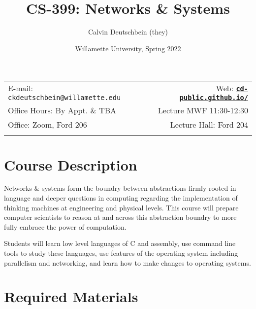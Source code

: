 \documentclass[11pt]{article}
\title{CS-399: Networks \& Systems}
\author{Calvin Deutschbein (they)}
\date{Willamette University, Spring 2022}
\newcommand{\blankline}{\quad\pagebreak[2]}
\begin{document}
\maketitle

\blankline

\begin{tabular*}{.93\textwidth}{@{\extracolsep{\fill}}lr}


E-mail: \texttt{ckdeutschbein@willamette.edu} & Web: \href{https://cd-public.github.io/courses/computer_security/451f21.html}{\tt\bf cd-public.github.io/}  \\

 Office Hours: By Appt. \& TBA  &  Lecture MWF 11:30-12:30 \\

 Office: Zoom, Ford 206 & Lecture Hall: Ford 204 \\
 & \\
\hline
\end{tabular*}

\vspace{5 mm}


\section*{Course Description}

 Networks \& systems form the boundry between abstractions firmly rooted in language and deeper questions in computing regarding the implementation of thinking machines at engineering and physical levels. This course will prepare computer scientists to reason at and across this abstraction boundry to more fully embrace the power of computation.

Students will learn low level languages of C and assembly, use command line tools to study these languages, use features of the operating system including parallelism and networking, and learn how to make changes to operating systems. 


\section*{Required Materials}
\end{document}
